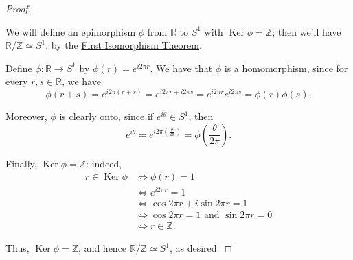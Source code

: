 \documentclass[10pt,]{book}
\theoremstyle{plain}
\theoremstyle{definition}
\theoremstyle{definition}
\theoremstyle{definition}
\theoremstyle{definition}
\numberwithin{equation}{section}
\def\Z{\mathbb{Z}}
\def\R{\mathbb{R}}
\DeclareMathOperator{\Ker}{Ker}
\newcommand{\amp}{&}
\begin{document}
\begin{proof}\hypertarget{proof-54}{}
We will define an epimorphism \(\phi\) from \(\R\) to \(S^1\) with \(\Ker \phi=\Z\); then we'll have \(\R/\Z \simeq S^1\), by the \hyperref[fit]{First Isomorphism Theorem}.%
\par
Define \(\phi:\R \to S^1\) by \(\phi(r)=e^{i2\pi r}\). We have that \(\phi\) is a homomorphism, since for every \(r,s\in \R\), we have%
\begin{equation*}
\phi(r+s)=e^{i2\pi (r+s)}=e^{i2\pi r+i2\pi s}=e^{i2\pi
r}e^{i2\pi s}=\phi(r)\phi(s).
\end{equation*}
%
\par
Moreover, \(\phi\) is clearly onto, since if \(e^{i\theta}\in S^1\), then%
\begin{equation*}
e^{i\theta}=e^{i2\pi\left(\frac{\theta}{2\pi}\right)}=\phi\left(\frac{\theta}{2\pi}\right).
\end{equation*}
%
\par
Finally, \(\Ker\phi=\Z\): indeed,%
\begin{align*}
r\in \Ker\phi \amp \Leftrightarrow \phi(r)=1\\
\amp \Leftrightarrow e^{i2\pi r}=1\\
\amp \Leftrightarrow \cos 2\pi r + i\sin 2\pi r=1\\
\amp \Leftrightarrow \cos 2\pi r = 1 \text{ and } \sin 2\pi r = 0\\
\amp \Leftrightarrow r\in \Z.
\end{align*}
%
\par
Thus, \(\Ker \phi = \Z\), and hence \(\R/\Z\simeq S^1\), as desired.%
\end{proof}
\typeout{************************************************}
\typeout{************************************************}
\end{document}
